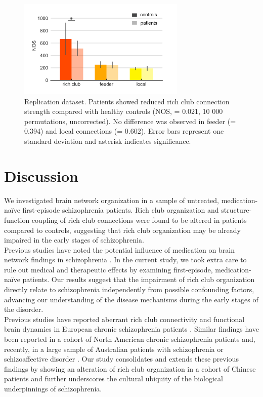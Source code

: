 \begin{refsection}
\begin{figure}[h]
\centering
  \includegraphics[width=8cm]{images/rcsczFig4.png}
  \caption{Replication dataset. Patients showed reduced rich club connection strength compared with healthy controls (NOS, \pval = 0.021, 10 000 permutations, uncorrected). No difference was observed in feeder (\pval = 0.394) and local connections (\pval = 0.602). Error bars represent one standard deviation and asterisk indicates significance.}
  \label{rcsczFig4}
\end{figure}


\section*{Discussion}
We investigated brain network organization in a sample of untreated, medication-na\"{i}ve first-episode schizophrenia patients. Rich club organization and structure-function coupling of rich club connections were found to be altered in patients compared to controls, suggesting that rich club organization may be already impaired in the early stages of schizophrenia.\\

Previous studies have noted the potential influence of medication on brain network findings in schizophrenia \citep{Crossley2017ConnectomicCO}. In the current study, we took extra care to rule out medical and therapeutic effects by examining first-episode, medication-na\"{i}ve patients. Our results suggest that the impairment of rich club organization directly relate to schizophrenia independently from possible confounding factors, advancing our understanding of the disease mechanisms during the early stages of the disorder.\\

Previous studies have reported aberrant rich club connectivity and functional brain dynamics in European chronic schizophrenia patients \citep{vanDenHeuvel2013AbnormalRC}. Similar findings have been reported in a cohort of North American chronic schizophrenia patients \citep{Yeo2016GraphMO} and, recently, in a large sample of Australian patients with schizophrenia or schizoaffective disorder \citep{Klauser2017WhiteMD}. Our study consolidates and extends these previous findings by showing an alteration of rich club organization in a cohort of Chinese patients and further underscores the cultural ubiquity of the biological underpinnings of schizophrenia.\\


\end{refsection}

